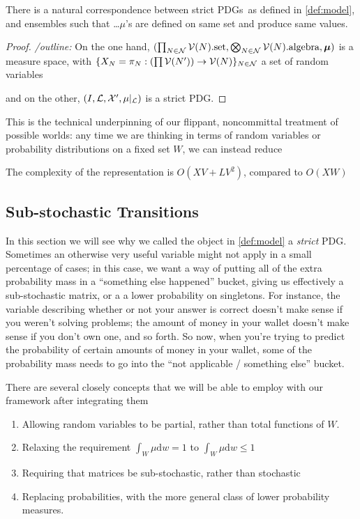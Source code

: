 \documentclass{article}
\newcommand{\MN}{PDG}
\newcommand{\MNs}{PDGs}
\newcommand\bmu{\boldsymbol{\mu}}
\begin{document}
	
	\begin{prop}
		There is a natural correspondence between strict \MNs\ as defined in \cref{def:model}, and ensembles such that  \ldots $\mu$'s are defined on same set and produce same values.
	\end{prop}
	\begin{proof}
		\textit{/outline:}
		On the one hand, $(\prod_{N \in \cal N} \mathcal V(N).\text{set}, \bigotimes_{N \in \cal N} \mathcal V(N).\text{algebra}, \bmu)$ is a measure space, with $\{X_N = \pi_N : \left(\prod\mathcal V(N')\right) \to  \mathcal V(N) \}_{N \in \cal N}$ a set of random variables
		
		and  on the other, $(I, \mathcal L, \mathcal X', \mu|_{\cal L})$ is a strict \MN.
	\end{proof}
	
	This is the technical underpinning of our flippant, noncommittal treatment of possible worlds: any time we are thinking in terms of random variables or probability distributions on a fixed set $W$, we can instead reduce
	
	
	The complexity of the representation is $O(XV + L V^2)$, compared to $O(XW)$
	
	

	\subsection{Sub-stochastic Transitions}
	
	In this section we will see why we called the object in \cref{def:model} a \textit{strict} \MN.	
	Sometimes an otherwise very useful variable might not apply in a small percentage of cases; in this case, we want a way of putting all of the extra probability mass in a ``something else happened'' bucket, giving us effectively a sub-stochastic matrix, or a a lower probability on singletons. For instance, the variable describing whether or not your answer is correct doesn't make sense if you weren't solving problems; the amount of money in your wallet doesn't make sense if you don't own one, and so forth. So now, when you're trying to predict the probability of certain amounts of money in your wallet, some of the probability mass needs to go into the ``not applicable / something else'' bucket. 
	
	There are several closely concepts that we will be able to employ with our framework after integrating them
	\begin{enumerate}[nosep]
		\item Allowing random variables to be partial, rather than total functions of $W$. 
		\item Relaxing the requirement $\int_W \mu \mathrm{d}w = 1$ to $\int_W \mu \mathrm{d}w \leq 1$
		\item Requiring that matrices be sub-stochastic, rather than stochastic
		\item Replacing probabilities, with the more general class of lower probability measures.
	\end{enumerate}
 
\end{document}
